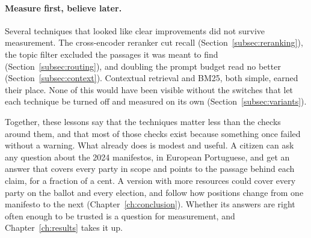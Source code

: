 \paragraph{Measure first, believe later.} Several techniques that looked like
clear improvements did not survive measurement. The cross-encoder reranker cut
recall (Section~\ref{subsec:reranking}), the
topic filter excluded the passages it was meant to find
(Section~\ref{subsec:routing}), and doubling the prompt budget read no better
(Section~\ref{subsec:context}). Contextual retrieval and BM25, both simple,
earned their place. None of this would have been visible without the switches
that let each technique be turned off and measured on its own
(Section~\ref{subsec:variants}).

Together, these lessons say that the techniques matter less than the
checks around them, and that most of those checks exist because something once
failed without a warning. What \sysname{} already does is modest and
useful. A citizen can ask any question about the 2024 manifestos, in European
Portuguese, and get an answer that covers every party in scope and points to
the passage behind each claim, for a fraction of a cent. A version with more
resources could cover every party on the ballot and every election, and follow
how positions change from one manifesto to the next
(Chapter~\ref{ch:conclusion}). Whether its answers are right often enough to be
trusted is a question for measurement, and Chapter~\ref{ch:results} takes it
up.

